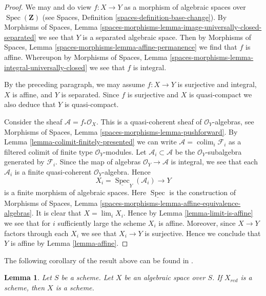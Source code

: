 \documentclass{stacks-project}
\newenvironment{reference}{\comment}{\endcomment}
\theoremstyle{plain}
\newtheorem{lemma}[subsection]{Lemma}
\theoremstyle{definition}
\theoremstyle{remark}
\numberwithin{equation}{subsection}
\def\lim{\mathop{\mathrm{lim}}\nolimits}
\def\colim{\mathop{\mathrm{colim}}\nolimits}
\def\Spec{\mathop{\mathrm{Spec}}}
\begin{document}
\begin{proof}
We may and do view $f : X \to Y$ as a morphism of algebraic spaces over
$\Spec(\mathbf{Z})$ (see
Spaces, Definition \ref{spaces-definition-base-change}).
By Morphisms of Spaces, Lemma
\ref{spaces-morphisms-lemma-image-universally-closed-separated}
we see that $Y$ is a separated algebraic space. Then by
Morphisms of Spaces, Lemma \ref{spaces-morphisms-lemma-affine-permanence}
we find that $f$ is affine. Whereupon by
Morphisms of Spaces, Lemma
\ref{spaces-morphisms-lemma-integral-universally-closed}
we see that $f$ is integral.

\medskip\noindent
By the preceding paragraph, we may assume $f : X \to Y$
is surjective and integral, $X$ is affine, and $Y$ is separated.
Since $f$ is surjective and $X$ is quasi-compact we also deduce that $Y$ is
quasi-compact.

\medskip\noindent
Consider the sheaf $\mathcal{A} = f_*\mathcal{O}_X$.
This is a quasi-coherent sheaf of $\mathcal{O}_Y$-algebras, see
Morphisms of Spaces, Lemma \ref{spaces-morphisms-lemma-pushforward}.
By Lemma \ref{lemma-colimit-finitely-presented}
we can write $\mathcal{A} = \colim_i \mathcal{F}_i$ as a filtered
colimit of finite type $\mathcal{O}_Y$-modules. Let
$\mathcal{A}_i \subset \mathcal{A}$ be the $\mathcal{O}_Y$-subalgebra
generated by $\mathcal{F}_i$. Since the map of algebras
$\mathcal{O}_Y \to \mathcal{A}$ is integral, we see that each $\mathcal{A}_i$
is a finite quasi-coherent $\mathcal{O}_Y$-algebra. Hence
$$
X_i = \underline{\Spec}_Y(\mathcal{A}_i) \longrightarrow Y
$$
is a finite morphism of algebraic spaces. Here 
$\underline{\Spec}$ is the construction of Morphisms of Spaces, Lemma
\ref{spaces-morphisms-lemma-affine-equivalence-algebras}.
It is clear
that $X = \lim_i X_i$. Hence by
Lemma \ref{lemma-limit-is-affine}
we see that for $i$ sufficiently large the scheme $X_i$ is affine.
Moreover, since $X \to Y$ factors through each $X_i$ we see that
$X_i \to Y$ is surjective. Hence we conclude that $Y$ is affine by
Lemma \ref{lemma-affine}.
\end{proof}

\noindent
The following corollary of the result above can be found in
\cite{CLO}.

\begin{lemma}
\label{lemma-reduction-scheme}
\begin{reference}
\cite[3.1.12]{CLO}
\end{reference}
Let $S$ be a scheme. Let $X$ be an algebraic space over $S$.
If $X_{red}$ is a scheme, then $X$ is a scheme.
\end{lemma}
\end{document}
